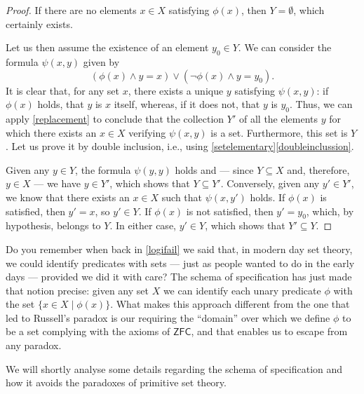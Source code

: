 \begin{proof}
If there are no elements $x\in X$ satisfying $\phi(x)$, then $Y = \emptyset$, which certainly exists.

Let us then assume the existence of an element $y_0 \in Y$. We can consider the formula $\psi(x,y)$ given by
\[ (\phi(x) \land y = x) \lor (\lnot \phi(x) \land y = y_0).\]
It is clear that, for any set $x$, there exists a unique $y$ satisfying $\psi(x,y)$: if $\phi(x)$ holds, that $y$ is $x$ itself, whereas, if it does not, that $y$ is $y_0$.
Thus, we can apply \ref{replacement} to conclude that the collection $Y'$ of all the elements $y$ for which there exists an $x\in X$ verifying $\psi(x,y)$ is a set. Furthermore, this set is $Y$. Let us prove it by double inclusion, i.e., using \ref{setelementary}\ref{doubleinclussion}.

Given any $y\in Y$, the formula $\psi(y,y)$ holds and --- since $Y\subseteq X$ and, therefore, $y\in X$ --- we have $y \in Y'$, which shows that $Y\subseteq Y'$.
Conversely, given any $y'\in Y'$, we know that there exists an $x\in X$ such that $\psi(x,y')$ holds.
If $\phi(x)$ is satisfied, then $y'=x$, so $y'\in Y$.
If $\phi(x)$ is not satisfied, then $y' = y_0$, which, by hypothesis, belongs to $Y$.
In either case, $y'\in Y$, which shows that $Y'\subseteq Y$.
\end{proof}

\begin{para}
Do you remember when back in \ref{logifail} we said that, in modern day set theory, we could identify predicates with sets --- just as people wanted to do in the early days --- provided we did it with care?
The schema of specification has just made that notion precise: given any set $X$ we can identify each unary predicate $\phi$ with the set $\{x \in X \mid \phi(x)\}$.
What makes this approach different from the one that led to Russell's paradox is our requiring the ``domain'' over which we define $\phi$ to be a set complying with the axioms of $\mathsf{ZFC}$, and that enables us to escape from any paradox.

We will shortly analyse some details regarding the schema of specification  and how it avoids the paradoxes of primitive set theory.
\end{para}


